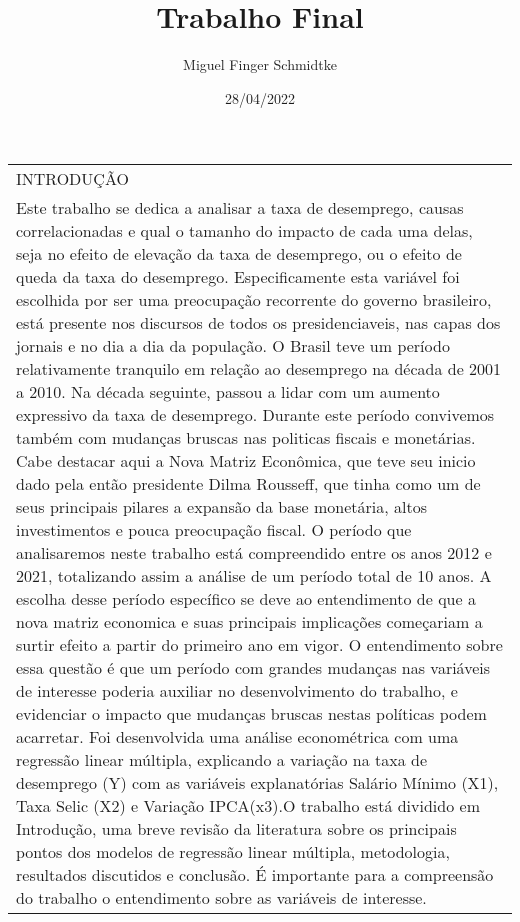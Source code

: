 \documentclass[
]{article}
\title{Trabalho Final}
\author{Miguel Finger Schmidtke}
\date{28/04/2022}
\begin{document}
\maketitle

\begin{longtable}[]{@{}
  >{\raggedright\arraybackslash}p{}@{}}
\toprule
\endhead
INTRODUÇÃO \\
Este trabalho se dedica a analisar a taxa de desemprego, causas
correlacionadas e qual o tamanho do impacto de cada uma delas, seja no
efeito de elevação da taxa de desemprego, ou o efeito de queda da taxa
do desemprego. Especificamente esta variável foi escolhida por ser uma
preocupação recorrente do governo brasileiro, está presente nos
discursos de todos os presidenciaveis, nas capas dos jornais e no dia a
dia da população. O Brasil teve um período relativamente tranquilo em
relação ao desemprego na década de 2001 a 2010. Na década seguinte,
passou a lidar com um aumento expressivo da taxa de desemprego. Durante
este período convivemos também com mudanças bruscas nas politicas
fiscais e monetárias. Cabe destacar aqui a Nova Matriz Econômica, que
teve seu inicio dado pela então presidente Dilma Rousseff, que tinha
como um de seus principais pilares a expansão da base monetária, altos
investimentos e pouca preocupação fiscal. O período que analisaremos
neste trabalho está compreendido entre os anos 2012 e 2021, totalizando
assim a análise de um período total de 10 anos. A escolha desse período
específico se deve ao entendimento de que a nova matriz economica e suas
principais implicações começariam a surtir efeito a partir do primeiro
ano em vigor. O entendimento sobre essa questão é que um período com
grandes mudanças nas variáveis de interesse poderia auxiliar no
desenvolvimento do trabalho, e evidenciar o impacto que mudanças bruscas
nestas políticas podem acarretar. Foi desenvolvida uma análise
econométrica com uma regressão linear múltipla, explicando a variação na
taxa de desemprego (Y) com as variáveis explanatórias Salário Mínimo
(X1), Taxa Selic (X2) e Variação IPCA(x3).O trabalho está dividido em
Introdução, uma breve revisão da literatura sobre os principais pontos
dos modelos de regressão linear múltipla, metodologia, resultados
discutidos e conclusão. É importante para a compreensão do trabalho o
entendimento sobre as variáveis de interesse. \\
\bottomrule
\end{longtable}
\end{document}
